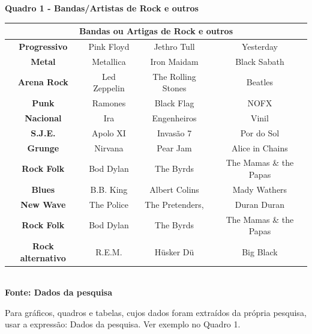 \begin{center}
	\centering
	\textbf{Quadro 1 - Bandas/Artistas de Rock e outros}\\
	\label{quadro1}
	\begin{tabular}{|c|c|c|c|} \hline
		\multicolumn{4}{|c|}{\textbf{Bandas ou Artigas de Rock e outros}}                             \\
		\hline \textbf{	Progressivo}      & Pink Floyd   & Jethro Tull        & Yesterday              \\
		\hline \textbf{ Metal}           & Metallica    & Iron Maidam        & Black Sabath           \\
		\hline \textbf{	Arena Rock}       & Led Zeppelin & The Rolling Stones & Beatles                \\
		\hline \textbf{ Punk}            & Ramones      & Black Flag         & NOFX                   \\
		\hline \textbf{	Nacional}         & Ira          & Engenheiros        & Vinil                  \\
		\hline \textbf{	S.J.E.}           & Apolo XI     & Invasão 7          & Por do Sol             \\
		\hline \textbf{	Grunge}           & Nirvana      & Pear Jam           & Alice in Chains        \\
		\hline \textbf{	Rock Folk}        & Bod Dylan    & The Byrds          & The Mamas \& the Papas \\
		\hline \textbf{	Blues}            & B.B. King    & Albert Colins      & Mady Wathers           \\
		\hline \textbf{	New Wave}         & The Police   & The Pretenders,    & Duran Duran            \\
		\hline \textbf{	Rock Folk}        & Bod Dylan    & The Byrds          & The Mamas \& the Papas \\
		\hline \textbf{	Rock alternativo} & R.E.M.       & Hüsker Dü          & Big Black              \\

		\hline
	\end{tabular}
	\vspace{0.1cm}
	{\footnotesize\\ \textbf{Fonte: Dados da pesquisa}}
\end{center}

Para gráficos, quadros e tabelas, cujos dados foram extraídos da própria pesquisa,
usar a expressão: Dados da pesquisa. Ver exemplo no Quadro 1.


